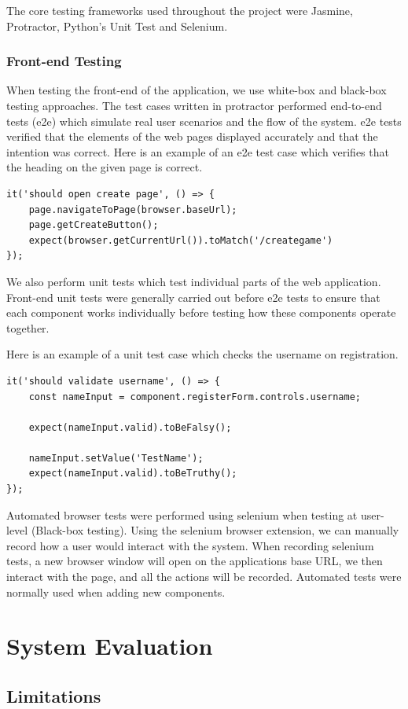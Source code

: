 The core testing frameworks used throughout the project were Jasmine, Protractor, Python's Unit Test and Selenium. 
\subsection{Front-end Testing}
When testing the front-end of the application, we use white-box and black-box testing approaches. The test cases written in protractor performed end-to-end tests (e2e) which simulate real user scenarios and the flow of the system. e2e tests verified that the elements of the web pages displayed accurately and that the intention was correct.
Here is an example of an e2e test case which verifies that the heading on the given page is correct.
\begin{verbatim}
it('should open create page', () => {
	page.navigateToPage(browser.baseUrl);
	page.getCreateButton();
	expect(browser.getCurrentUrl()).toMatch('/creategame')
});
\end{verbatim}

We also perform unit tests which test individual parts of the web application. Front-end unit tests were generally carried out before e2e tests to ensure that each component works individually before testing how these components operate together.

\newpage
Here is an example of a unit test case which checks the username on registration.
\begin{verbatim}
it('should validate username', () => {
	const nameInput = component.registerForm.controls.username;
	
	expect(nameInput.valid).toBeFalsy();
	
	nameInput.setValue('TestName');
	expect(nameInput.valid).toBeTruthy();
});
\end{verbatim}

Automated browser tests were performed using selenium when testing at user-level (Black-box testing). Using the selenium browser extension, we can manually record how a user would interact with the system. When recording selenium tests, a new browser window will open on the applications base URL, we then interact with the page, and all the actions will be recorded. Automated tests were normally used when adding new components. \hfill \break

\chapter{System Evaluation}
\section{Limitations}
